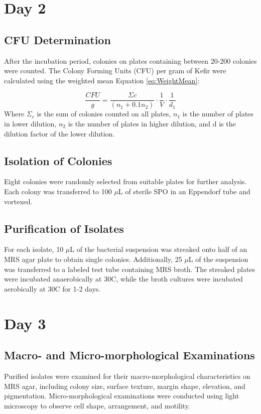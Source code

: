 \section{Day 2}
\subsection*{CFU Determination}
After the incubation period, colonies on plates containing between 20-200 colonies were counted. The Colony Forming Units (CFU) per gram of Kefir were calculated using the weighted mean Equation \ref*{eq:WeightMean}:

\begin{equation}
    \frac{CFU}{g} =  \frac{\Sigma c}{(n_1 + 0.1 n_2)} \cdot \frac{1}{V} \cdot \frac{1}{d_1}
    \label{eq:WeightMean}
\end{equation}
\vspace{0.5em}
Where $\Sigma_c$ is the sum of colonies counted on all plates, $n_1$ is the number of plates in lower dilution, $n_2$ is the number of plates in higher dilution, and d is the dilution factor of the lower dilution.

\subsection*{Isolation of Colonies}
Eight colonies were randomly selected from suitable plates for further analysis. Each colony was transferred to 100 $\mu$L of sterile SPO in an Eppendorf tube and vortexed.

\subsection*{Purification of Isolates}
For each isolate, 10 $\mu$L of the bacterial suspension was streaked onto half of an MRS agar plate to obtain single colonies. Additionally, 25 $\mu$L of the suspension was transferred to a labeled test tube containing MRS broth.
\vspace{0.5em}
The streaked plates were incubated anaerobically at 30\textdegree C, while the broth cultures were incubated aerobically at 30\textdegree C for 1-2 days.

\section{Day 3}
\subsection*{Macro- and Micro-morphological Examinations}
Purified isolates were examined for their macro-morphological characteristics on MRS agar, including colony size, surface texture, margin shape, elevation, and pigmentation.
\vspace{0.5em}
Micro-morphological examinations were conducted using light microscopy to observe cell shape, arrangement, and motility.

